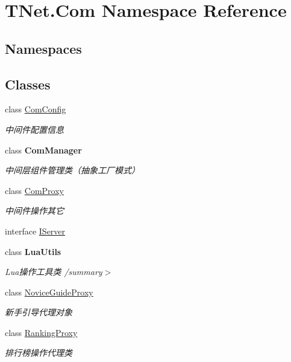 \hypertarget{namespace_t_net_1_1_com}{}\section{T\+Net.\+Com Namespace Reference}
\label{namespace_t_net_1_1_com}
\subsection*{Namespaces}
\begin{DoxyCompactItemize}
\end{DoxyCompactItemize}
\subsection*{Classes}
\begin{DoxyCompactItemize}
\item 
class \mbox{\hyperlink{class_t_net_1_1_com_1_1_com_config}{Com\+Config}}
\begin{DoxyCompactList}\small\item\em 中间件配置信息 \end{DoxyCompactList}\item 
class {\bfseries Com\+Manager}
\begin{DoxyCompactList}\small\item\em 中间层组件管理类（抽象工厂模式） \end{DoxyCompactList}\item 
class \mbox{\hyperlink{class_t_net_1_1_com_1_1_com_proxy}{Com\+Proxy}}
\begin{DoxyCompactList}\small\item\em 中间件操作其它 \end{DoxyCompactList}\item 
interface \mbox{\hyperlink{interface_t_net_1_1_com_1_1_i_server}{I\+Server}}
\item 
class {\bfseries Lua\+Utils}
\begin{DoxyCompactList}\small\item\em Lua操作工具类 /summary$>$ \end{DoxyCompactList}\item 
class \mbox{\hyperlink{class_t_net_1_1_com_1_1_novice_guide_proxy}{Novice\+Guide\+Proxy}}
\begin{DoxyCompactList}\small\item\em 新手引导代理对象 \end{DoxyCompactList}\item 
class \mbox{\hyperlink{class_t_net_1_1_com_1_1_ranking_proxy}{Ranking\+Proxy}}
\begin{DoxyCompactList}\small\item\em 排行榜操作代理类 \end{DoxyCompactList}\end{DoxyCompactItemize}
